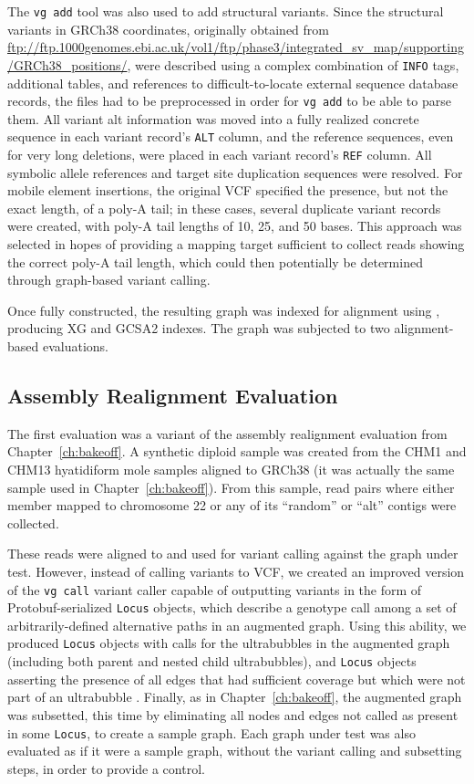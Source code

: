 The \texttt{vg add} tool was also used to add structural variants. Since the structural variants in GRCh38 coordinates, originally obtained from \url{ftp://ftp.1000genomes.ebi.ac.uk/vol1/ftp/phase3/integrated_sv_map/supporting/GRCh38_positions/}, were described using a complex combination of \texttt{INFO} tags, additional tables, and references to difficult-to-locate external sequence database records, the files had to be preprocessed in order for \texttt{vg add} to be able to parse them. All variant alt information was moved into a fully realized concrete sequence in each variant record's \texttt{ALT} column, and the reference sequences, even for very long deletions, were placed in each variant record's \texttt{REF} column. All symbolic allele references and target site duplication sequences were resolved. For mobile element insertions, the original VCF specified the presence, but not the exact length, of a poly-A tail; in these cases, several duplicate variant records were created, with poly-A tail lengths of 10, 25, and 50 bases. This approach was selected in hopes of providing a mapping target sufficient to collect reads showing the correct poly-A tail length, which could then potentially be determined through graph-based variant calling.

Once fully constructed, the resulting graph was indexed for alignment using \vg, producing XG and GCSA2 indexes. The graph was subjected to two alignment-based evaluations.

\subsection{Assembly Realignment Evaluation}

The first evaluation was a variant of the assembly realignment evaluation from Chapter~\ref{ch:bakeoff}. A synthetic diploid sample was created from the CHM1 and CHM13 hyatidiform mole samples aligned to GRCh38 (it was actually the same sample used in Chapter~\ref{ch:bakeoff}). From this sample, read pairs where either member mapped to chromosome 22 or any of its ``random'' or ``alt'' contigs were collected. 

These reads were aligned to and used for variant calling against the graph under test. However, instead of calling variants to VCF, we created an improved version of the \texttt{vg call} variant caller capable of outputting variants in the form of Protobuf-serialized \texttt{Locus} objects, which describe a genotype call among a set of arbitrarily-defined alternative paths in an augmented graph. Using this ability, we produced \texttt{Locus} objects with calls for the ultrabubbles in the augmented graph (including both parent and nested child ultrabubbles), and \texttt{Locus} objects asserting the presence of all edges that had sufficient coverage but which were not part of an ultrabubble \cite{paten2017superbubbles}. Finally, as in Chapter~\ref{ch:bakeoff}, the augmented graph was subsetted, this time by eliminating all nodes and edges not called as present in some \texttt{Locus}, to create a sample graph. Each graph under test was also evaluated as if it were a sample graph, without the variant calling and subsetting steps, in order to provide a control.


